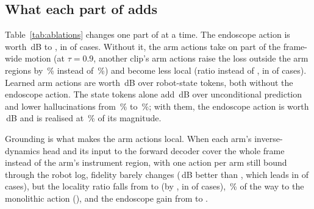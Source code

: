 \subsection{What each part of \method{} adds}\label{sec:parts}
Table~\ref{tab:ablations} changes one part of \method{} at a time. The endoscope action is worth \,dB  to \method{}, in  of  cases. Without it, the arm actions take on part of the frame-wide motion (at $\tau=0.9$, another clip's arm actions raise the loss outside the arm regions by \,\% instead of \,\%) and become less local (ratio  instead of , in  of  cases). Learned arm actions are worth \,dB  over robot-state tokens, both without the endoscope action. The state tokens alone add \,dB  over unconditional prediction and lower hallucinations from \,\% to \,\%; with them, the endoscope action is worth \,dB  and is realised at \,\% of its magnitude.

Grounding is what makes the arm actions local. When each arm's inverse-dynamics head and its input to the forward decoder cover the whole frame instead of the arm's instrument region, with one action per arm still bound through the robot log, fidelity barely changes (\,dB  better than \method{}, which leads in  of  cases), but the locality ratio falls from  to  (by  , in  of  cases), \,\% of the way to the monolithic action (), and the endoscope gain from  to .

